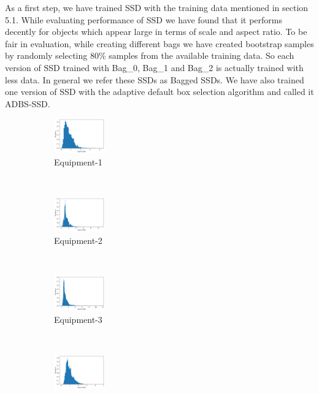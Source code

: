 \documentclass[conference]{IEEEtran}
\begin{document}
As a first step, we have trained SSD with the training data mentioned in section 5.1. While evaluating performance of SSD we have found that it performs decently for objects which appear large in terms of scale and aspect ratio. To be fair in evaluation, while creating different bags we have created bootstrap samples by randomly selecting 80\% samples from the available training data. So each version of SSD trained with Bag\_0, Bag\_1 and Bag\_2 is actually trained with less data. In general we refer these SSDs as Bagged SSDs. We have also trained one version of SSD with the adaptive default box selection algorithm and called it ADBS-SSD.
\begin{figure}
    \centering
    \begin{subfigure}[b]{0.45\linewidth}
        \includegraphics[width=\textwidth, height=1.5cm]{images/Bus_Distr.png}
        \caption{Equipment-1}
        \label{fig:bus}
    \end{subfigure}
    ~
    \begin{subfigure}[b]{0.45\linewidth}
        \includegraphics[width=\textwidth, height=1.5cm]{images/Drillrig_Distr.png}
        \caption{Equipment-2}
        \label{fig:drillrig}
    \end{subfigure}
	\\
    \begin{subfigure}[b]{0.45\linewidth}
        \includegraphics[width=\textwidth, height=1.5cm]{images/Equipment_Distr.png}
        \caption{Equipment-3}
        \label{fig:equipment}
    \end{subfigure}
    ~
    \begin{subfigure}[b]{0.45\linewidth}
        \includegraphics[width=\textwidth, height=1.5cm]{images/Excavator_Distr.png}

\end{subfigure}
\end{figure}
\end{document}
